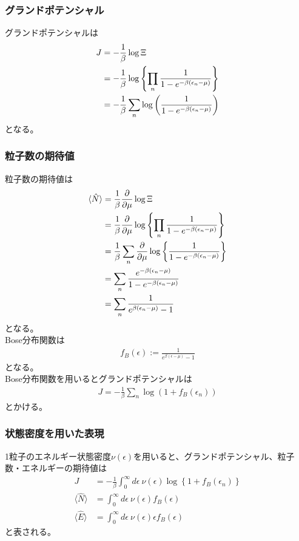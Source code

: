 \documentclass[dvipdfmx, 11pt, a4paper]{jsarticle}
\theoremstyle{definition}
\begin{document}
\subsubsection{グランドポテンシャル}
    グランドポテンシャルは
    \begin{align}
        J &= -\frac{1}{\beta} \log \Xi \notag \\
        &= -\frac{1}{\beta} \log \left\{  \prod_n \frac{1}{1 - e^{-\beta (\epsilon_n - \mu)}} \right\} \notag \\
        &= -\frac{1}{\beta} \sum_n \log \left( \frac{1}{1 - e^{-\beta (\epsilon_n - \mu)}} \right)
    \end{align}
    となる。
\subsubsection{粒子数の期待値}
    粒子数の期待値は
    \begin{align}
        \langle \hat{N} \rangle &= \frac{1}{\beta} \frac{\partial }{\partial \mu} \log \Xi \notag \\
        &= \frac{1}{\beta} \frac{\partial }{\partial \mu} \log \left\{ \prod_n \frac{1}{1 - e^{-\beta (\epsilon_n - \mu)}} \right\} \notag \\
        &= \frac{1}{\beta} \sum_n \frac{\partial }{\partial \mu} \log \left\{ \frac{1}{1 - e^{-\beta (\epsilon_n - \mu)}} \right\} \notag \\
        &= \sum_n \frac{e^{-\beta (\epsilon_n - \mu)}}{1 - e^{-\beta (\epsilon_n - \mu)}} \notag \\
        &= \sum_n \frac{1}{e^{\beta (\epsilon_n - \mu)} - 1}
    \end{align}
    となる。\\
    Bose分布関数は
    \begin{align}
        f_B (\epsilon) := \frac{1}{e^{\beta (\epsilon - \mu)} - 1}
    \end{align}
    となる。\\
    Bose分布関数を用いるとグランドポテンシャルは
    \begin{align}
        J = -\frac{1}{\beta} \sum_n \log (1 + f_B (\epsilon_n))
    \end{align}
    とかける。
\subsubsection{状態密度を用いた表現}
    1粒子のエネルギー状態密度$\nu (\epsilon)$を用いると、グランドポテンシャル、粒子数・エネルギーの期待値は
    \begin{align}
        J &= -\frac{1}{\beta} \int_{0}^{\infty} d\epsilon\ \nu (\epsilon) \log \left\{ 1 + f_B (\epsilon_n) \right\} \\
        \langle \hat{N} \rangle &= \int_0^{\infty} d\epsilon\ \nu (\epsilon) f_B(\epsilon) \\
        \langle \hat{E} \rangle &= \int_0^{\infty} d\epsilon\  \nu (\epsilon) \epsilon f_B(\epsilon)
    \end{align}
    と表される。
\end{document}
